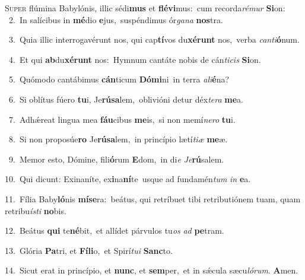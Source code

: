 \lettrine{\initial\textcolor{\initialcolor}{S}}{uper} flúmina Babylónis, illic sédi\textbf{mus} et \textbf{flé}\-\textbf{vi}mus:~\star cum recorda\-\textit{ré}\-\textit{mur} \textbf{Si}\-on:\\
{\numbfont\textcolor{\numbcolor}{~2.}}~In salícibus in \textbf{mé}\-dio \textbf{e}\-jus,~\star suspéndimus ór\-\textit{ga}\-\textit{na} \textbf{nos}\-tra.\par
{\numbfont\textcolor{\numbcolor}{~3.}}~Quia illic interrogavérunt nos, qui cap\-\textbf{tí}\-vos du\-\textbf{xé}\-\textbf{runt} nos,~\star verba \textit{can}\-\textit{ti}\textbf{ó}num.\par
{\numbfont\textcolor{\numbcolor}{~4.}}~Et qui \textbf{ab}\-du\-\textbf{xé}\-\textbf{runt} nos:~\star Hymnum cantáte nobis de cán\-\textit{ti}\-\textit{cis} \textbf{Si}\-on.\par
{\numbfont\textcolor{\numbcolor}{~5.}}~Quómodo cantábimus \textbf{cán}\-ticum \textbf{Dó}\-\textbf{mi}ni~\star in terra \textit{a}\-\textit{li}\textbf{é}na?\par
{\numbfont\textcolor{\numbcolor}{~6.}}~Si oblítus fúero \textbf{tu}\-i, Je\-\textbf{rú}\-\textbf{sa}lem,~\star oblivióni detur déx\-\textit{te}\-\textit{ra} \textbf{me}\-a.\par
{\numbfont\textcolor{\numbcolor}{~7.}}~Adhǽreat lingua mea \textbf{fáu}\-cibus \textbf{me}\-is,~\star si non memí\-\textit{ne}\-\textit{ro} \textbf{tu}\-i.\par
{\numbfont\textcolor{\numbcolor}{~8.}}~Si non proposúe\textbf{ro} Je\-\textbf{rú}\-\textbf{sa}lem,~\star in princípio lætí\-\textit{ti}\-\textit{æ} \textbf{me}\-æ.\par
{\numbfont\textcolor{\numbcolor}{~9.}}~Memor esto, Dómine, fili\-\textbf{ó}\-rum \textbf{E}\-dom,~\star in di\textit{e} \textit{Je}\-\textbf{rú}salem.\par
{\numbfont\textcolor{\numbcolor}{10.}}~Qui dicunt: Exinaníte, ex\-\textbf{i}\-na\-\textbf{ní}\-te~\star usque ad fundamén\textit{tum} \textit{in} \textbf{e}\-a.\par
{\numbfont\textcolor{\numbcolor}{11.}}~Fília Baby\-\textbf{ló}\-nis \textbf{mí}\-\textbf{se}ra:~\star beátus, qui retríbuet tibi retributiónem tuam, quam retribu\-\textit{ís}\-\textit{ti} \textbf{no}\-bis.\par
{\numbfont\textcolor{\numbcolor}{12.}}~Beátus \textbf{qui} te\-\textbf{né}\-bit,~\star et allídet párvulos tu\textit{os} \textit{ad} \textbf{pe}\-tram.\par
{\numbfont\textcolor{\numbcolor}{13.}}~Glória \textbf{Pa}\-tri, et \textbf{Fí}\-\textbf{li}o,~\star et Spirí\-\textit{tu}\-\textit{i} \textbf{Sanc}\-to.\par
{\numbfont\textcolor{\numbcolor}{14.}}~Sicut erat in princípio, et \textbf{nunc}\-, et \textbf{sem}\-per,~\star et in sǽcula sæcu\-\textit{ló}\-\textit{rum}. \textbf{A}\-men.\par
